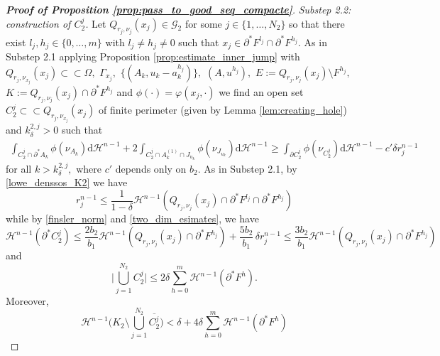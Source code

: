 \documentclass[reqno]{amsart}
\numberwithin{equation}{section}
\theoremstyle{plain}
\theoremstyle{definition}
\newcommand{\cH}{\mathcal{H}}
\newcommand{\cG}{\mathcal{G}}
\newcommand{\p}{\partial}
\newcommand{\cl}[1]{\overline{#1}}
\newcommand{\bound}{b}
\renewcommand{\d}{\mathrm{d}}
\newcommand{\strictlyincluded}{\subset\subset}
\begin{document}
\begin{proof}[\textbf{Proof of Proposition \ref{prop:pass_to_good_seq_compacte}}]
{\it Substep 2.2: construction of $C_2^j$.} Let $Q_{r_j,\nu_j}(x_j) \in \cG_2$ for some $j\in \{1,\ldots,N_2\}$ so that there exist $l_j,h_j\in\{0,\ldots,m\}$ with $l_j\ne h_j\ne 0$ such that $x_j\in \p^*F^{l_j}\cap \p^*F^{h_j}.$  As in Substep 2.1 applying Proposition \ref{prop:estimate_inner_jump} with $Q_{r_j,\nu_{x_j}}(x_j)\strictlyincluded \Omega,$ $\Gamma_{x_j},$ $\{(A_k,u_k-a_k^{h_j})\},$ $(A,u^{h_j}),$ $E:=Q_{r_j,\nu_j}(x_j)\setminus F^{h_j},$ $K:=Q_{r_j,\nu_j}(x_j)\cap\p^* F^{h_j}$ and $\phi(\cdot)=\varphi(x_j,\cdot)$ we find an open set $C_2^j\strictlyincluded Q_{r_j,\nu_{x_j}}(x_j)$ of finite perimeter (given by Lemma \ref{lem:creating_hole}) and $k_\delta^{2,j}>0$ such that  
\begin{align}\label{casasasasas}
\int_{C_2^j\cap\p^*A_k} \phi(\nu_{A_k})\d\cH^{n-1}  +   2\int_{C_2^j \cap A_k^{(1)} \cap J_{u_k}}   \phi(\nu_{J_{u_k}}) \d\cH^{n-1}  
\ge \int_{\p C_2^j} \phi(\nu_{C_2^j})\d\cH^{n-1} -c' \delta r_j^{n-1} 
\end{align}
for all $k>k_\delta^{2,j},$ where $c'$ depends only on $\bound_2.$ As in Substep 2.1,
by \eqref{lowe_denssos_K2} we have
\begin{equation}\label{rj2_esimates}
r_j^{n-1} \le \frac{1}{1-\delta}\cH^{n-1}(Q_{r_j,\nu_j}(x_j)\cap \p^*F^{l_j}\cap \p^*F^{h_j}) 
\end{equation}
while by \eqref{finsler_norm} and \eqref{two_dim_esimates}, we have
\begin{equation}\label{per_Cj2_opop}
\cH^{n-1}(\p^*C_2^j) \le \frac{2\bound_2}{\bound_1}\cH^{n-1}(Q_{r_j,\nu_j}(x_j)\cap \p^*F^{h_j}) + \frac{5\bound_2}{\bound_1}\,\delta r_j^{n-1} \le 
\frac{3\bound_2}{\bound_1} \cH^{n-1}(Q_{r_j,\nu_j}(x_j) \cap \p^*F^{h_j}) 
\end{equation}
and 
\begin{equation}\label{tot_volest_K3}
\Big|\bigcup_{j=1}^{N_2} C_2^j\Big| \le 2\delta \sum_{h=0}^{m}\cH^{n-1}(\p^*F^h).
\end{equation} 
Moreover, 
\begin{equation}\label{outside_Dj2}
\cH^{n-1}\Big(K_2\setminus \bigcup_{j=1}^{N_2}\cl{C_2^j}\Big)< \delta + 4\delta\sum_{h=0}^{m}\cH^{n-1}(\p^*F^h) 
\end{equation}



\end{proof}
\end{document}
